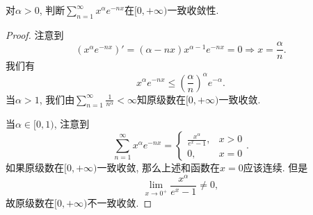 \documentclass[../../main.tex]{subfiles}
\begin{document}
\begin{example}
对$\alpha>0$, 判断$\sum\limits_{n=1}^{\infty}x^\alpha e^{-nx}$在$[0,+\infty)$一致收敛性.
\end{example}
\begin{proof}
注意到
$$
\left( x^{\alpha}e^{-nx} \right) '=(\alpha -nx)x^{\alpha -1}e^{-nx}=0\Rightarrow x=\frac{\alpha}{n}.
$$
我们有
$$
x^\alpha e^{-nx}\leqslant\left(\frac{\alpha}{n}\right)^\alpha e^{-\alpha}.
$$
当$\alpha>1$, 我们由$\sum\limits_{n=1}^{\infty}\frac{1}{n^\alpha}<\infty$知原级数在$[0,+\infty)$一致收敛.

当$\alpha\in[0,1)$, 注意到
$$
\sum_{n=1}^{\infty}x^\alpha e^{-nx}=
\begin{cases}
\frac{x^\alpha}{e^x-1},&x>0\\
0,&x=0
\end{cases}.
$$
如果原级数在$[0,+\infty)$一致收敛, 那么上述和函数在$x=0$应该连续. 但是
$$
\lim_{x\to0^+}\frac{x^\alpha}{e^x-1}\neq0,
$$
故原级数在$[0,+\infty)$不一致收敛.

\end{proof}
\end{document}
